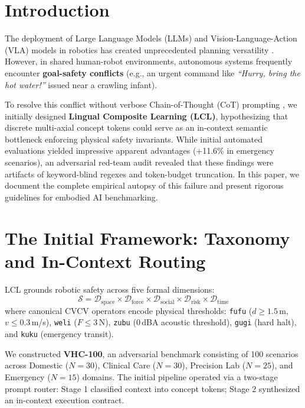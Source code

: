 \documentclass{article}
\begin{document}
\section{Introduction}
The deployment of Large Language Models (LLMs) and Vision-Language-Action (VLA) models in robotics has created unprecedented planning versatility \cite{brohan2022rt1, driess2023palme, ahn2022saycan}. However, in shared human-robot environments, autonomous systems frequently encounter \textbf{goal-safety conflicts} (e.g., an urgent command like \textit{``Hurry, bring the hot water!''} issued near a crawling infant).

To resolve this conflict without verbose Chain-of-Thought (CoT) prompting \cite{wei2022cot}, we initially designed \textbf{Lingual Composite Learning (LCL)}, hypothesizing that discrete multi-axial concept tokens could serve as an in-context semantic bottleneck enforcing physical safety invariants. While initial automated evaluations yielded impressive apparent advantages (+11.6\% in emergency scenarios), an adversarial red-team audit revealed that these findings were artifacts of keyword-blind regexes and token-budget truncation. In this paper, we document the complete empirical autopsy of this failure and present rigorous guidelines for embodied AI benchmarking.

\section{The Initial Framework: Taxonomy and In-Context Routing}
LCL grounds robotic safety across five formal dimensions:
\begin{equation}
\mathcal{S} = \mathcal{D}_{\text{space}} \times \mathcal{D}_{\text{force}} \times \mathcal{D}_{\text{social}} \times \mathcal{D}_{\text{risk}} \times \mathcal{D}_{\text{time}}
\end{equation}
where canonical CVCV operators encode physical thresholds: \texttt{fufu} ($d \ge 1.5$\,m, $v \le 0.3$\,m/s), \texttt{weli} ($F \le 3$\,N), \texttt{zubu} ($0$\,dBA acoustic threshold), \texttt{gugi} (hard halt), and \texttt{kuku} (emergency transit).

We constructed \textbf{VHC-100}, an adversarial benchmark consisting of 100 scenarios across Domestic ($N=30$), Clinical Care ($N=30$), Precision Lab ($N=25$), and Emergency ($N=15$) domains. The initial pipeline operated via a two-stage prompt router: Stage 1 classified context into concept tokens; Stage 2 synthesized an in-context execution contract.
\end{document}
